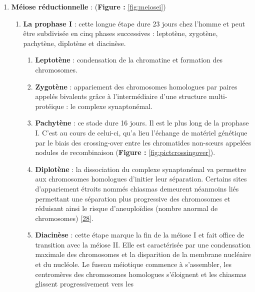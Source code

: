 \documentclass[12pt,a4paper,twoside]{ugathesis}
\providecommand{\tightlist}{%
  \setlength{\itemsep}{0pt}\setlength{\parskip}{0pt}}
\theoremstyle{definition}
\theoremstyle{definition}
\theoremstyle{definition}
\theoremstyle{remark}
\begin{document}
\begin{enumerate}
\def\labelenumi{\arabic{enumi}.}
\tightlist
\item
  \textbf{Méiose réductionnelle} : (\textbf{Figure : }\ref{fig:meiosei})

  \begin{enumerate}
  \def\labelenumii{\alph{enumii}.}
  \item
    \textbf{La prophase I} : cette longue étape dure 23 jours chez
    l'homme et peut être subdivisée en cinq phases successives :
    leptotène, zygotène, pachytène, diplotène et diacinèse.

    \begin{enumerate}
    \def\labelenumiii{\roman{enumiii}.}
    \tightlist
    \item
      \textbf{Leptotène} : condensation de la chromatine et formation
      des chromosomes.\\
    \item
      \textbf{Zygotène} : appariement des chromosomes homologues par
      paires appelés bivalents grâce à l'intermédiaire d'une structure
      multi-protéique : le complexe synaptonémal.\\
    \item
      \textbf{Pachytène} : ce stade dure 16 jours. Il est le plus long
      de la prophase I. C'est au cours de celui-ci, qu'a lieu l'échange
      de matériel génétique par le biais des crossing-over entre les
      chromatides non-sœurs appelées nodules de recombinaison
      (\textbf{Figure : }\ref{fig:pictcrossingover}).\\
    \item
      \textbf{Diplotène} : la dissociation du complexe synaptonémal va
      permettre aux chromosomes homologues d'initier leur séparation.
      Certains sites d'appariement étroits nommés chiasmas demeurent
      néanmoins liés permettant une séparation plus progressive des
      chromosomes et réduisant ainsi le risque d'aneuploïdies (nombre
      anormal de chromosomes)
      {[}\protect\hyperlink{ref-Handyside2012}{28}{]}.\\
    \item
      \textbf{Diacinèse} : cette étape marque la fin de la méiose I et
      fait office de transition avec la méiose II. Elle est caractérisée
      par une condensation maximale des chromosomes et la disparition de
      la membrane nucléaire et du nucléole. Le fuseau méiotique commence
      à s'assembler, les centromères des chromosomes homologues
      s'éloignent et les chiasmas glissent progressivement vers les

\end{enumerate}
\end{enumerate}
\end{enumerate}
\end{document}

